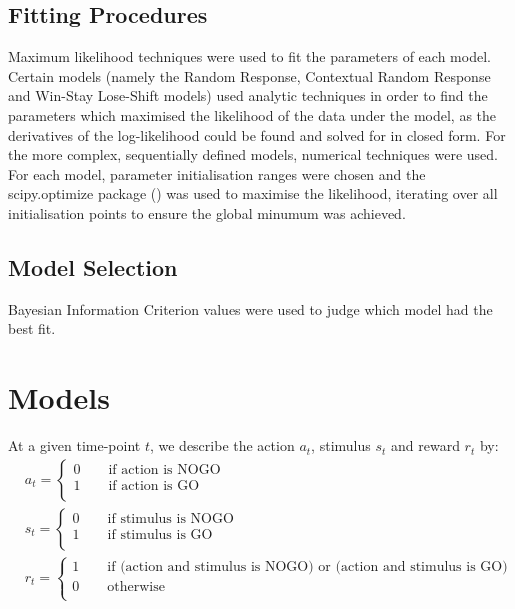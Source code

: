 \documentclass[12pt]{article}
\begin{document}
\subsection{Fitting Procedures}
Maximum likelihood techniques were used to fit the parameters of each model.
Certain models (namely the Random Response, Contextual Random Response and Win-Stay Lose-Shift models) used analytic techniques in order to find the parameters which maximised the likelihood of the data under the model, as the derivatives of the log-likelihood could be found and solved for in closed form. For the more complex, sequentially defined models, numerical techniques were used. For each model, parameter initialisation ranges were chosen and the scipy.optimize package (\cite{2020SciPy-NMeth}) was used to maximise the likelihood, iterating over all initialisation points to ensure the global minumum was achieved.

\subsection{Model Selection}
Bayesian Information Criterion values were used to judge which model had the best fit. 

\section{Models}
At a given time-point $t$, we describe the action $a_t$, stimulus $s_t$ and reward $r_t$ by:
\begin{align}
		&a_t = \begin{cases}
		0  \qquad  \text{if action is NOGO}\\
		1  \qquad  \text{if action is GO} \\
	\end{cases}\\
		&s_t = \begin{cases}
		0  \qquad  \text{if stimulus is NOGO}\\
		1  \qquad  \text{if stimulus is GO} \\
	\end{cases}\\
		&r_t = \begin{cases}
		1  \qquad  \text{if (action and stimulus is NOGO) or (action and stimulus is GO)}\\
		0  \qquad  \text{otherwise} \\
	\end{cases}
\end{align}
\end{document}
